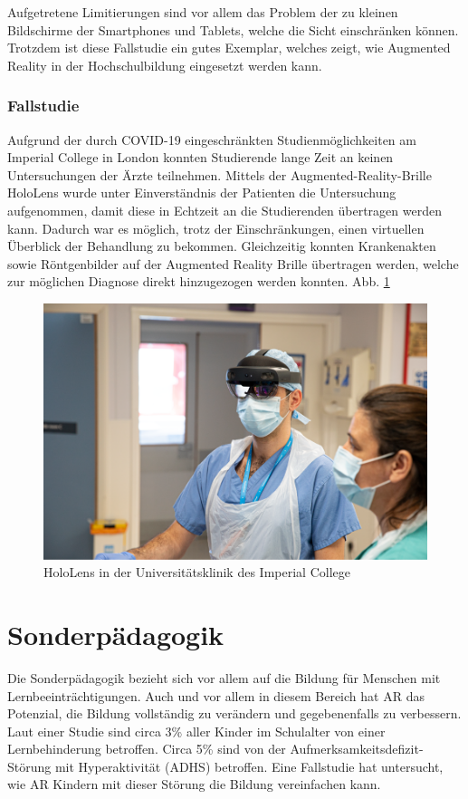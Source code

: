 \documentclass[conference]{IEEEtran}
\begin{document}
Aufgetretene Limitierungen sind vor allem das Problem der zu kleinen Bildschirme der Smartphones und Tablets, welche die Sicht einschränken können. Trotzdem ist diese 
Fallstudie ein gutes Exemplar, welches zeigt, wie Augmented Reality in der Hochschulbildung eingesetzt werden kann.

\subsubsection{Fallstudie}
Aufgrund der durch COVID-19 eingeschränkten Studienmöglichkeiten am Imperial College in London konnten Studierende lange Zeit an keinen Untersuchungen der Ärzte teilnehmen. \cite{w4}
Mittels der Augmented-Reality-Brille HoloLens wurde unter Einverständnis der Patienten die Untersuchung aufgenommen, damit diese in Echtzeit an die Studierenden übertragen werden kann. Dadurch war es möglich, trotz der Einschränkungen, einen virtuellen Überblick der Behandlung zu bekommen. Gleichzeitig konnten Krankenakten sowie Röntgenbilder
auf der Augmented Reality Brille übertragen werden, welche zur möglichen Diagnose direkt hinzugezogen werden konnten. Abb. \ref{fig7}

\begin{figure}[htbp]
    \centerline{\includegraphics[scale=0.2]{img/med.png}}
    \caption{HoloLens in der Universitätsklinik des Imperial College \cite{w4}}
    \label{fig7}
\end{figure}

\section{Sonderpädagogik}
Die Sonderpädagogik bezieht sich vor allem auf die Bildung für Menschen mit Lernbeeinträchtigungen. Auch und vor allem in diesem Bereich hat AR das Potenzial, die Bildung vollständig zu verändern und gegebenenfalls zu verbessern.
Laut einer Studie sind circa 3\% aller Kinder im Schulalter von einer Lernbehinderung betroffen. Circa 5\% sind von der Aufmerksamkeitsdefizit-Störung mit Hyperaktivität (ADHS) betroffen. Eine Fallstudie hat untersucht, wie AR Kindern mit dieser Störung die Bildung vereinfachen kann. \cite{b16}
\end{document}
